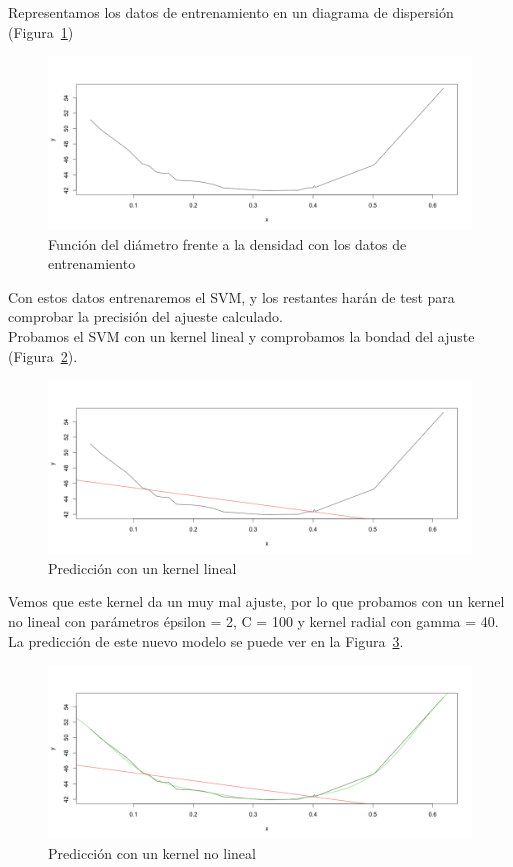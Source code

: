 \documentclass[12pt,a4paper,twoside,openright,titlepage,final]{article}
\begin{document}
Representamos los datos de entrenamiento en un diagrama de dispersión (Figura~\ref{fig:plot_datos_entrenamiento})\\

\begin{figure}
\centering
\includegraphics[width=0.8\linewidth]{imagenes/plot_datos_entrenamiento}
\caption{Función del diámetro frente a la densidad con los datos de entrenamiento}
\label{fig:plot_datos_entrenamiento}
\end{figure}

Con estos datos entrenaremos el SVM, y los restantes harán de test para comprobar la precisión del ajueste calculado.\\

Probamos el SVM con un kernel lineal y comprobamos la bondad del ajuste (Figura~\ref{fig:plot_kernel_lineal}).\\

\begin{figure}
\centering
\includegraphics[width=0.8\linewidth]{imagenes/plot_kernel_lineal}
\caption{Predicción con un kernel lineal}
\label{fig:plot_kernel_lineal}
\end{figure}

Vemos que este kernel da un muy mal ajuste, por lo que probamos con un kernel no lineal con parámetros épsilon = 2, C = 100 y kernel radial con gamma = 40. La predicción de este nuevo modelo se puede ver en la Figura~\ref{fig:plot_kernel_no_lineal}.\\

\begin{figure}
\centering
\includegraphics[width=0.8\linewidth]{imagenes/plot_kernel_no_lineal}
\caption{Predicción con un kernel no lineal}
\label{fig:plot_kernel_no_lineal}
\end{figure}
\end{document}
